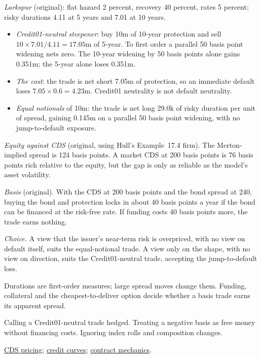\begin{qfmethod}
 \emph{Larkspur} (original): flat hazard 2 percent, recovery 40 percent, rates 5 percent; risky durations 4.11 at 5 years and 7.01 at 10 years.
\begin{itemize}
\item \emph{Credit01-neutral steepener}: buy 10m of 10-year protection and sell $10\times7.01/4.11=17.05$m of 5-year. To first order a parallel 50 basis point widening nets zero. The 10-year widening by 50 basis points alone gains 0.351m; the 5-year alone loses 0.351m.
\item \emph{The cost}: the trade is net short 7.05m of protection, so an immediate default loses $7.05\times0.6=4.23$m. Credit01 neutrality is not default neutrality.
\item \emph{Equal notionals} of 10m: the trade is net long 29.0k of risky duration per unit of spread, gaining 0.145m on a parallel 50 basis point widening, with no jump-to-default exposure.
\end{itemize}
\emph{Equity against CDS} (original, using Hull's Example~17.4 firm). The Merton-implied spread is 124 basis points. A market CDS at 200 basis points is 76 basis points rich relative to the equity, but the gap is only as reliable as the model's asset volatility.

\emph{Basis} (original). With the CDS at 200 basis points and the bond spread at 240, buying the bond and protection locks in about 40 basis points a year if the bond can be financed at the risk-free rate. If funding costs 40 basis points more, the trade earns nothing.

\emph{Choice.} A view that the issuer's near-term risk is overpriced, with no view on default itself, suits the equal-notional trade. A view only on the shape, with no view on direction, suits the Credit01-neutral trade, accepting the jump-to-default loss.

 Durations are first-order measures; large spread moves change them. Funding, collateral and the cheapest-to-deliver option decide whether a basis trade earns its apparent spread.

 Calling a Credit01-neutral trade hedged. Treating a negative basis as free money without financing costs. Ignoring index rolls and composition changes.

 \hyperref[meth:cds-pricing]{CDS pricing}; \hyperref[meth:credit-spread-term-structure]{credit curves}; \hyperref[mech:cds-contract-credit-events]{contract mechanics}.

\end{qfmethod}
